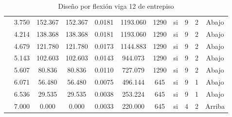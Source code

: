 \begin{table}[H]
{\begin{tabular}{|c|c|c|c|c|c|c|c|c|c|c|}
\cline{2-11}          & 3.750 & 152.367 & 152.367 & 0.0181 & 1193.060 & 1290  & si    & 9     & 2     & Abajo \bigstrut\\
\cline{2-11}          & 4.214 & 138.368 & 138.368 & 0.0181 & 1193.060 & 1290  & si    & 9     & 2     & Abajo \bigstrut\\
\cline{2-11}          & 4.679 & 121.780 & 121.780 & 0.0173 & 1144.883 & 1290  & si    & 9     & 2     & Abajo \bigstrut\\
\cline{2-11}          & 5.143 & 102.603 & 102.603 & 0.0143 & 944.073 & 1290  & si    & 9     & 2     & Abajo \bigstrut\\
\cline{2-11}          & 5.607 & 80.836 & 80.836 & 0.0110 & 727.079 & 1290  & si    & 9     & 2     & Abajo \bigstrut\\
\cline{2-11}          & 6.071 & 56.480 & 56.480 & 0.0075 & 496.144 & 645   & si    & 9     & 1     & Abajo \bigstrut\\
\cline{2-11}          & 6.536 & 29.535 & 29.535 & 0.0038 & 253.224 & 645   & si    & 9     & 1     & Abajo \bigstrut\\
\cline{2-11}          & 7.000 & 0.000 & 0.000 & 0.0033 & 220.000 & 645   & si    & 4     & 2     & Arriba \bigstrut\\
    \hline
    \end{tabular}}%
  \caption{Diseño por flexión viga 12 de entrepiso}
  \label{tab:F V12E}
\end{table}%
